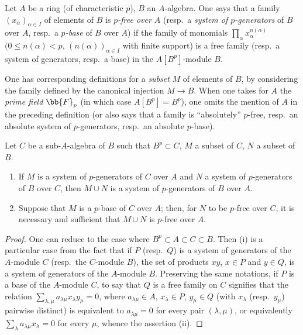\begin{definition}[21.1.9]
\label{0.21.1.9}
Let $A$ be a ring (of characteristic $p$), $B$ an $A$-algebra.
One says that a family $(x_\alpha)_{\alpha\in I}$ of elements of $B$ is \emph{$p$-free over $A$} (resp.\ a \emph{system of $p$-generators} of $B$ over $A$, resp.\ a \emph{$p$-base} of $B$ over $A$) if the family of monomials $\prod_\alpha x_\alpha^{n(\alpha)}$ $(0\leq n(\alpha)<p$, $(n(\alpha))_{\alpha\in I}$ with finite support) is a free family (resp.\ a system of generators, resp.\ a base) in the $A[B^p]$-module $B$.
\end{definition}

One has corresponding definitions for a \emph{subset} $M$ of elements of $B$, by considering the family defined by the canonical injection $M\to B$.
When one takes for $A$ the \emph{prime field} $\bb{F}_p$ (in which case $A[B^p]=B^p$), one omits the mention of $A$ in the preceding definition (or also says that a family is ``absolutely'' $p$-free, resp.\ an absolute system of $p$-generators, resp.\ an absolute $p$-base).

\begin{lemma}[21.1.10]
\label{0.21.1.10}
Let $C$ be a sub-$A$-algebra of $B$ such that $B^p\subset C$, $M$ a subset of $C$, $N$ a subset of $B$.
\begin{enumerate}
  \item[\rm(i)] If $M$ is a system of $p$-generators of $C$ over $A$ and $N$ a system of $p$-generators of $B$ over $C$, then $M\cup N$ is a system of $p$-generators of $B$ over $A$.
  \item[\rm(ii)] Suppose that $M$ is a $p$-base of $C$ over $A$; then, for $N$ to be $p$-free over $C$, it is necessary and sufficient that $M\cup N$ is $p$-free over $A$.
\end{enumerate}
\end{lemma}

\begin{proof}
One can reduce to the case where $B^p\subset A\subset C\subset B$.
Then (i) is a particular case from the fact that if $P$ (resp.\ $Q$) is a system of generators of the $A$-module $C$ (resp.\ the $C$-module $B$), the set of products $xy$, $x\in P$ and $y\in Q$, is a system of generators of the $A$-module $B$.
Preserving the same notations, if $P$ is a base of the $A$-module $C$, to say that $Q$ is a free family on $C$ signifies that the relation $\sum_{\lambda,\mu}a_{\lambda\mu}x_\lambda y_\mu=0$, where $a_{\lambda\mu}\in A$, $x_\lambda\in P$, $y_\mu\in Q$ (with $x_\lambda$ (resp.\ $y_\mu$) pairwise distinct) is equivalent to $a_{\lambda\mu}=0$ for every pair $(\lambda,\mu)$, or equivalently $\sum_\lambda a_{\lambda\mu}x_\lambda=0$ for every $\mu$, whence the assertion (ii).
\end{proof}

